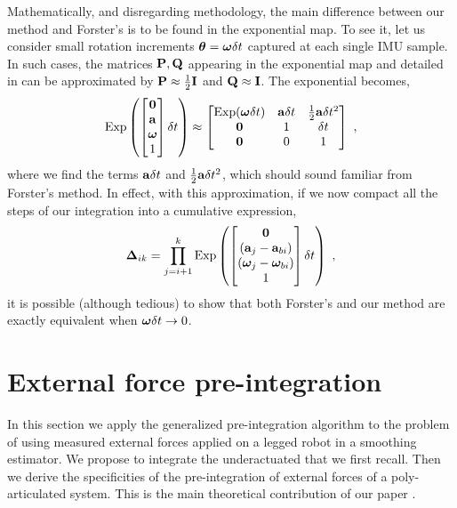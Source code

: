 Mathematically, and disregarding methodology, the main difference between our method and Forster's \cite{forster2017-TRO} is to be found in the exponential map. 
To see it, let us consider small rotation increments ${{\bm \theta}}={{\bm \omega}}\delta t$ captured at each single IMU sample. 
In such cases, the matrices ${\bf P},{\bf Q}$ appearing in the exponential map  and detailed in  can be approximated by ${\bf P}\approx\tfrac12{\bf I}$ and ${\bf Q}\approx{\bf I}$.
The exponential becomes,
%
\begin{align}
    \operatorname*{Exp}\left(\begin{bmatrix}
    \bf0 \\ {\bf a} \\ {{\bm \omega}} \\ 1
    \end{bmatrix}\delta t\right) \approx \begin{bmatrix}
    \operatorname*{Exp}({{\bm \omega}}\delta t) & {\bf a}\delta t & \tfrac12{\bf a}\delta t^2 \\
    \bf0 & 1 & \delta t \\
    \bf0 & 0 & 1
    \end{bmatrix}
~,
\end{align}
%
where we find the terms ${\bf a}\delta t$ and $\tfrac12{\bf a}\delta t^2$, which should sound familiar from Forster's method. 
In effect, with this approximation, if we now compact all the steps  of our integration into a cumulative expression,
%
\begin{align}
    {{\bm \Delta}}_{ik} = \prod_{j=i+1}^k \operatorname*{Exp}\left(\begin{bmatrix}
    \bf0 \\ ({\bf a}_j-{\bf a}_{bi}) \\ ({{\bm \omega}}_j-{{\bm \omega}}_{bi}) \\ 1
    \end{bmatrix}\delta t\right)
~,
\end{align}
%
it is possible (although tedious) to show that both Forster's and our method are exactly equivalent when ${{\bm \omega}}\delta t\to0$.





\section{External force pre-integration}
In this section we apply the generalized pre-integration algorithm to the problem of using measured external
forces applied on a legged robot in a smoothing estimator. We propose to integrate the underactuated that we first recall. Then 
we derive the specificities of the pre-integration of external forces of a poly-articulated system. This is the main theoretical contribution
of our paper \cite{fourmy2021contact}.


